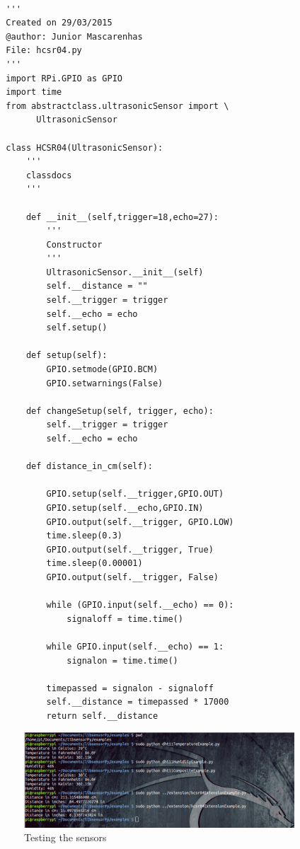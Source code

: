 \documentclass{acm_proc_article-sp}
\begin{document}
\renewcommand{\theFancyVerbLine}{
  \sffamily\textcolor[rgb]{0.5,0.5,0.5}{\scriptsize\arabic{FancyVerbLine}}}
\begin{verbatim}

  '''
  Created on 29/03/2015
  @author: Junior Mascarenhas
  File: hcsr04.py
  '''
  import RPi.GPIO as GPIO
  import time
  from abstractclass.ultrasonicSensor import \
  		UltrasonicSensor

  class HCSR04(UltrasonicSensor):
      '''
      classdocs
      '''

      def __init__(self,trigger=18,echo=27):
          '''
          Constructor
          '''
          UltrasonicSensor.__init__(self)
          self.__distance = ""
          self.__trigger = trigger
          self.__echo = echo
          self.setup()
        
      def setup(self):
          GPIO.setmode(GPIO.BCM)
          GPIO.setwarnings(False)

      def changeSetup(self, trigger, echo):
          self.__trigger = trigger
          self.__echo = echo

      def distance_in_cm(self):

          GPIO.setup(self.__trigger,GPIO.OUT)
          GPIO.setup(self.__echo,GPIO.IN)
          GPIO.output(self.__trigger, GPIO.LOW)
          time.sleep(0.3)
          GPIO.output(self.__trigger, True)
          time.sleep(0.00001)
          GPIO.output(self.__trigger, False)

          while (GPIO.input(self.__echo) == 0):
              signaloff = time.time()

          while GPIO.input(self.__echo) == 1:
              signalon = time.time()

          timepassed = signalon - signaloff
          self.__distance = timepassed * 17000
          return self.__distance

\end{verbatim}
\begin{figure}[ht]
    \centering
    	\includegraphics[width=0.9\textwidth]{pictures/tests.png}
    		\caption{Testing the sensors}  
    		\label{fig:results}  	
\end{figure}
\end{document}
